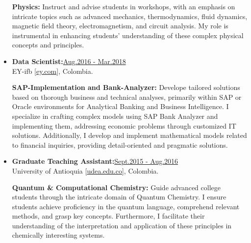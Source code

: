 \begin{itemize}
              {\noindent
                  \textbf{Physics:}
                  Instruct and advise students in workshops, with an emphasis on intricate topics such as advanced mechanics, thermodynamics, fluid dynamics, magnetic field theory, electromagnetism, and circuit analysis. My role is instrumental in enhancing students' understanding of these complex physical concepts and principles.
              }



    \item {\bf Data Scientist:}\hfill \href{.}{Aug.2016 - Mar.2018}\\
          EY-ifb [\href{www.ey.com/en\_gl/ey-ifb}{ey.com}],
          Colombia.

              {\noindent
                  \textbf{SAP-Implementation and Bank-Analyzer:}
                  Develope tailored solutions based on thorough business and technical analyses, primarily within SAP or Oracle environments for Analytical Banking and Business Intelligence. I specialize in crafting complex models using SAP Bank Analyzer and implementing them, addressing economic problems through customized IT solutions. Additionally, I develop and implement mathematical models related to financial inquiries, providing detail-oriented and pragmatic solutions.
              }

    \item {\bf Graduate Teaching Assistant:}\hfill \href{.}{Sept.2015 - Aug.2016}\\
          University of Antioquia [\href{www.udea.edu.co}{udea.edu.co}],
          Colombia.

              {\noindent
                  \textbf{Quantum \& Computational Chemistry:}
                  Guide advanced college students through the intricate domain of Quantum Chemistry. I ensure students achieve proficiency in the quantum language, comprehend relevant methods, and grasp key concepts. Furthermore, I facilitate their understanding of the interpretation and application of these principles in chemically interesting systems.
              }

\end{itemize}

